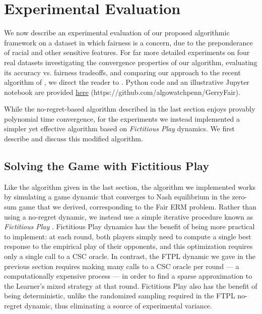 \section{Experimental Evaluation}
\label{sec:empirical}

We now describe an experimental evaluation of our proposed algorithmic framework
on a dataset in which fairness is a concern, due to the preponderance of racial and
other sensitive features. For far more detailed experiments on four
real datasets investigating the convergence properties
of our algorithm, evaluating its accuracy vs. fairness tradeoffs, and comparing our approach
to the recent algorithm of \cite{reductions}, we direct the reader to \cite{experimental}. Python code and an illustrative Jupyter notebook
are provided \href{https://github.com/algowatchpenn/GerryFair}{here} (https://github.com/algowatchpenn/GerryFair). 


While the no-regret-based algorithm described in the last
section enjoys provably polynomial time convergence, for the experiments we
instead implemented a simpler yet effective algorithm based on {\em Fictitious Play\/} dynamics.
We first describe and discuss this modified algorithm.

\subsection{Solving the Game with Fictitious Play}

Like the algorithm given in the last section, the algorithm we implemented
works by simulating a game dynamic that converges to Nash equilibrium
in the zero-sum game that we derived, corresponding to the Fair ERM problem.
Rather than using a no-regret dynamic, we instead use  a
simple iterative procedure known as \emph{Fictitious Play}
\citep{brown_1949}. Fictitious Play dynamics has the benefit of being more practical to
implement: at each round, both players simply need to compute a single best response to the empirical play of their opponents, and this optimization requires only a single call to a CSC oracle.
In contrast, the FTPL dynamic we gave in the previous section requires making many calls to a
CSC oracle per round --- a computationally expensive process ---
in order to find a sparse approximation to the Learner's mixed strategy at that round.
Fictitious Play also has the benefit of being
deterministic, unlike the randomized sampling required in the FTPL no-regret dynamic,
thus eliminating a source of experimental variance.


